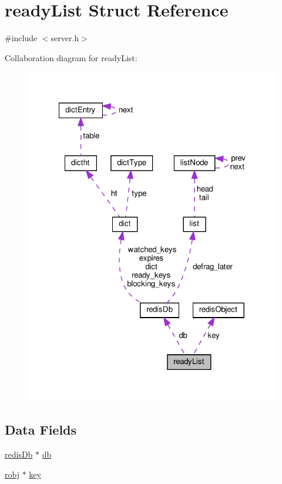 \hypertarget{structready_list}{}\section{ready\+List Struct Reference}
\label{structready_list}


{\ttfamily \#include $<$server.\+h$>$}



Collaboration diagram for ready\+List\+:
\nopagebreak
\begin{figure}[H]
\begin{center}
\leavevmode
\includegraphics[width=322pt]{structready_list__coll__graph}
\end{center}
\end{figure}
\subsection*{Data Fields}
\begin{DoxyCompactItemize}
\item 
\hyperlink{structredis_db}{redis\+Db} $\ast$ \hyperlink{structready_list_a9bee04e09635a42fef289e42a89f5502}{db}
\item 
\hyperlink{server_8h_a540f174d2685422fbd7d12e3cd44c8e2}{robj} $\ast$ \hyperlink{structready_list_adc0ee0ed345db513fb6fac27511be4f1}{key}
\end{DoxyCompactItemize}


